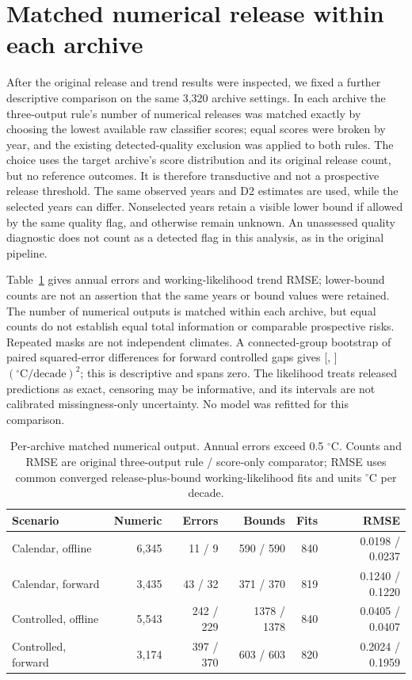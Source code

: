 \section{Matched numerical release within each archive}
After the original release and trend results were inspected, we fixed a further descriptive comparison on the same 3,320 archive settings. In each archive the three-output rule's number of numerical releases was matched exactly by choosing the lowest available raw classifier scores; equal scores were broken by year, and the existing detected-quality exclusion was applied to both rules. The choice uses the target archive's score distribution and its original release count, but no reference outcomes. It is therefore transductive and not a prospective release threshold. The same observed years and D2 estimates are used, while the selected years can differ. Nonselected years retain a visible lower bound if allowed by the same quality flag, and otherwise remain unknown. An unassessed quality diagnostic does not count as a detected flag in this analysis, as in the original pipeline.

Table~\ref{tab:archive-matched-release} gives annual errors and working-likelihood trend RMSE; lower-bound counts are not an assertion that the same years or bound values were retained. The number of numerical outputs is matched within each archive, but equal counts do not establish equal total information or comparable prospective risks. Repeated masks are not independent climates. A connected-group bootstrap of paired squared-error differences for forward controlled gaps gives [\AMBootstrapLow, \AMBootstrapHigh] $({}^{\circ}\mathrm{C}/\mathrm{decade})^2$; this is descriptive and spans zero. The likelihood treats released predictions as exact, censoring may be informative, and its intervals are not calibrated missingness-only uncertainty. No model was refitted for this comparison.

\begin{table}[ht]
\caption{Per-archive matched numerical output. Annual errors exceed 0.5 $^{\circ}$C. Counts and RMSE are original three-output rule / score-only comparator; RMSE uses common converged release-plus-bound working-likelihood fits and units $^{\circ}$C per decade.}
\label{tab:archive-matched-release}
\centering\small
\begin{tabular}{lrrrrr}\toprule
Scenario & Numeric & Errors & Bounds & Fits & RMSE \\
\midrule
Calendar, offline & 6,345 & 11 / 9 & 590 / 590 & 840 & 0.0198 / 0.0237 \\
Calendar, forward & 3,435 & 43 / 32 & 371 / 370 & 819 & 0.1240 / 0.1220 \\
Controlled, offline & 5,543 & 242 / 229 & 1378 / 1378 & 840 & 0.0405 / 0.0407 \\
Controlled, forward & 3,174 & 397 / 370 & 603 / 603 & 820 & 0.2024 / 0.1959 \\
\bottomrule\end{tabular}\end{table}

